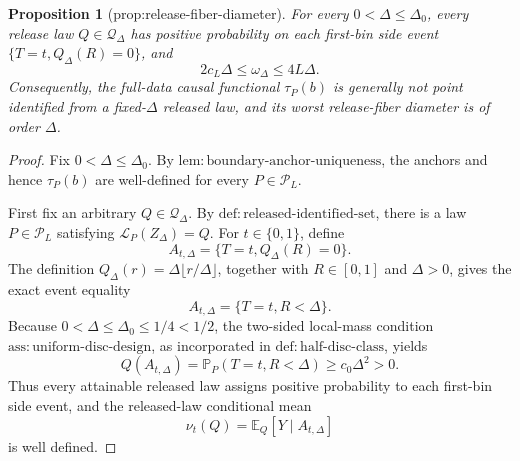 \documentclass{article}
\newtheorem{proposition}{Proposition}
\begin{document}
\begin{proposition}[prop:release-fiber-diameter]\label{prop:release-fiber-diameter}
For every \(0<\Delta\leq\Delta_0\), every release law \(Q\in\mathcal Q_\Delta\) has positive probability on each first-bin side event \(\{T=t,Q_\Delta(R)=0\}\), and
\[
 2c_L\Delta\leq\omega_\Delta\leq4L\Delta.
\]
Consequently, the full-data causal functional \(\tau_P(b)\) is generally not point identified from a fixed-\(\Delta\) released law, and its worst release-fiber diameter is of order \(\Delta\).
\end{proposition}
\begin{proof}
Fix \(0<\Delta\leq\Delta_0\).  By \(\mathrm{lem:boundary\text{-}anchor\text{-}uniqueness}\), the anchors and hence \(\tau_P(b)\) are well-defined for every \(P\in\mathcal P_L\).

First fix an arbitrary \(Q\in\mathcal Q_\Delta\).  By \(\mathrm{def:released\text{-}identified\text{-}set}\), there is a law \(P\in\mathcal P_L\) satisfying \(\mathcal L_P(Z_\Delta)=Q\).  For \(t\in\{0,1\}\), define
\[
 A_{t,\Delta}=\{T=t,Q_\Delta(R)=0\}.
\]
The definition \(Q_\Delta(r)=\Delta\lfloor r/\Delta\rfloor\), together with \(R\in[0,1]\) and \(\Delta>0\), gives the exact event equality
\[
 A_{t,\Delta}=\{T=t,R<\Delta\}.
\]
Because \(0<\Delta\leq\Delta_0\leq1/4<1/2\), the two-sided local-mass condition \(\mathrm{ass:uniform\text{-}disc\text{-}design}\), as incorporated in \(\mathrm{def:half\text{-}disc\text{-}class}\), yields
\[
 Q(A_{t,\Delta})
 =\mathbb P_P(T=t,R<\Delta)
 \geq c_0\Delta^2>0.
\]
Thus every attainable released law assigns positive probability to each first-bin side event, and the released-law conditional mean
\[
 \nu_t(Q)=\mathbb E_Q[Y\mid A_{t,\Delta}]
\]
is well defined.


\end{proof}
\end{document}
